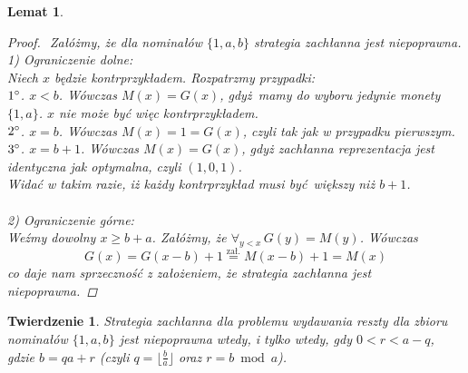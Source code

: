 \documentclass[12pt]{article}
\newtheorem*{theorem*}{Twierdzenie}
\newtheorem{lemma}{Lemat}
\begin{document}
\begin{titlepage}
\begin{lemma}
\begin{proof}$ $\newline
Załóżmy, że dla nominałów $\{1, a, b\}$ strategia zachłanna jest niepoprawna.\\
1) Ograniczenie dolne:\\    
Niech $x$ będzie kontrprzykładem. Rozpatrzmy przypadki:\\
$1\degree$. $x < b$. Wówczas $M(x) = G(x)$, gdyż mamy do
wyboru jedynie monety $\{1, a\}$. $x$ nie może być więc kontrprzykładem.\\
$2\degree$. $x = b$. Wówczas $M(x) = 1 = G(x)$, czyli tak jak w przypadku pierwszym.\\
$3\degree$. $x = b + 1 $. Wówczas $M(x) = G(x)$, gdyż zachłanna reprezentacja jest
identyczna jak optymalna, czyli $(1, 0, 1)$.\\
Widać w takim razie, iż każdy kontrprzykład musi być większy niż $b + 1$.\\\\
2) Ograniczenie górne:\\
Weźmy dowolny $x \geq b + a$. Załóżmy, że $\forall_{y<x}\,G(y) = M(y)$. Wówczas
$$G(x) = G(x-b) + 1 \stackrel{\text{zał.}}{=} M(x-b) + 1 = M(x)$$
co daje nam sprzeczność z założeniem, że strategia zachłanna jest niepoprawna.
\end{proof}
\end{lemma}


\begin{theorem*}\normalfont
Strategia zachłanna dla problemu wydawania reszty dla zbioru nominałów 
$\{1, a, b\}$ jest niepoprawna wtedy, i tylko wtedy, gdy $0 < r < a - q$,
gdzie $b = qa + r$ (czyli $q = \lfloor \frac{b}{a} \rfloor$ oraz $r = b \bmod a$).


\end{theorem*}
\end{titlepage}
\end{document}
